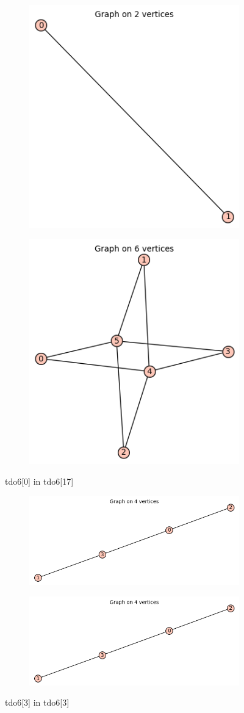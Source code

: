 \documentclass[12pt, a4paper]{article}
\begin{document}
\begin{center}
\begin{figure}[!htb]
\centering
\begin{subfigure}{0.5\textwidth}
  \centering
  \includegraphics[width=0.5\linewidth]{tdo6[0]}
\end{subfigure}%
\begin{subfigure}{0.5\textwidth}
  \centering
  \includegraphics[width=0.5\linewidth]{tdo6[17]}
\end{subfigure}
\caption{tdo6[0] in tdo6[17]}
\label{fig:test}
\end{figure}

\begin{figure}[!htb]
\centering
\begin{subfigure}{0.5\textwidth}
  \centering
  \includegraphics[width=0.5\linewidth]{tdo6[3]}
\end{subfigure}%
\begin{subfigure}{0.5\textwidth}
  \centering
  \includegraphics[width=0.5\linewidth]{tdo6[3]}
\end{subfigure}
\caption{tdo6[3] in tdo6[3]}
\label{fig:test}
\end{figure}


\end{center}
\end{document}

